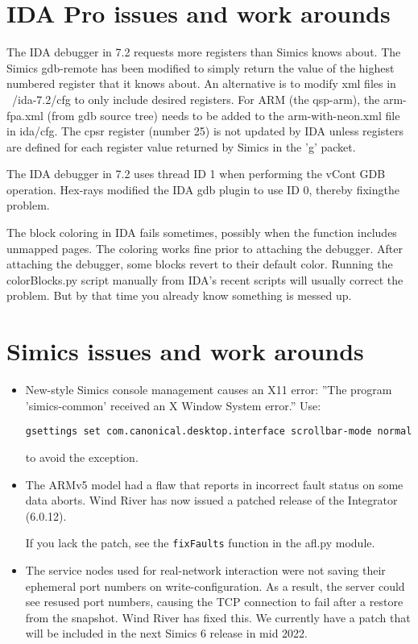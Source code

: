 \documentclass[titlepage]{article}
\begin{document}
\begin{appendices}
\section{IDA Pro issues and work arounds}
The IDA debugger in 7.2 requests more registers than Simics knows about.  The Simics gdb-remote has been modified
to simply return the value of the highest numbered register that it knows about.  An alternative is to modify
xml files in ~/ida-7.2/cfg to only include desired registers.   For ARM (the qsp-arm), the arm-fpa.xml (from gdb source
tree) needs to be added to the arm-with-neon.xml file in ida/cfg.  The cpsr register (number 25) is not updated by IDA
unless registers are defined for each register value returned by Simics in the 'g' packet.

The IDA debugger in 7.2 uses thread ID 1 when performing the vCont GDB operation.  Hex-rays modified the IDA gdb plugin to
use ID 0, thereby fixingthe problem.

The block coloring in IDA fails sometimes, possibly when the function includes unmapped pages.  The coloring works fine prior
to attaching the debugger.  After attaching the debugger, some blocks revert to their default color.  Running the colorBlocks.py script
manually from IDA's recent scripts will usually correct the problem.  But by that time you already know something is messed up.

\section{Simics issues and work arounds}
\begin{itemize}
\item New-style Simics console management causes an X11 error: ''The program 'simics-common' received an X Window System error.''
Use:
\begin{verbatim}
gsettings set com.canonical.desktop.interface scrollbar-mode normal
\end{verbatim}
\noindent to avoid the exception.
\item The ARMv5 model had a flaw that reports in incorrect fault status on some data aborts.  Wind River has now issued a patched release
of the Integrator (6.0.12).

If you lack the patch, see the {\tt fixFaults} function in the afl.py module.

\item The service nodes used for real-network interaction were not saving their ephemeral port numbers on write-configuration.  As a result,
the server could see resused port numbers, causing the TCP connection to fail after a restore from the snapshot.  Wind River has fixed this.
We currently have a patch that will be included in the next Simics 6 release in mid 2022.
\end{itemize}


\end{appendices}
\end{document}
